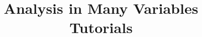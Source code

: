 \documentclass[a4paper, answers]{exam}
\title{Analysis in Many Variables Tutorials}
\author{}
\begin{document}
    \maketitle
    \begin{questions}
        
    \end{questions}
\end{document}
